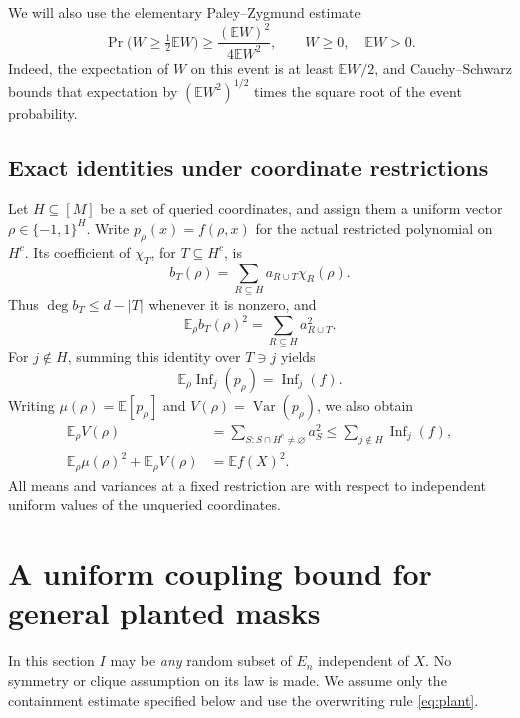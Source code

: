 \documentclass[11pt]{article}
\newcommand{\E}{\mathbb E}
\newcommand{\Var}{\operatorname{Var}}
\newcommand{\Inf}{\operatorname{Inf}}
\newcommand{\1}{\mathbf 1}
\theoremstyle{definition}
\theoremstyle{remark}
\numberwithin{equation}{section}
\begin{document}
We will also use the elementary Paley--Zygmund estimate
\begin{equation}\label{eq:pz}
 \Pr\bigl(W\ge\tfrac12\E W\bigr)
 \ge\frac{(\E W)^2}{4\E W^2},\qquad W\ge0,\quad\E W>0.
\end{equation}
Indeed, the expectation of $W$ on this event is at least $\E W/2$, and Cauchy--Schwarz bounds that expectation by $(\E W^2)^{1/2}$ times the square root of the event probability.

\subsection{Exact identities under coordinate restrictions}

Let $H\subseteq[M]$ be a set of queried coordinates, and assign them a uniform vector $\rho\in\{-1,1\}^H$. Write $p_\rho(x)=f(\rho,x)$ for the actual restricted polynomial on $H^c$. Its coefficient of $\chi_T$, for $T\subseteq H^c$, is
\begin{equation}\label{eq:restricted-coeff}
 b_T(\rho)=\sum_{R\subseteq H}a_{R\cup T}\chi_R(\rho).
\end{equation}
Thus $\deg b_T\le d-|T|$ whenever it is nonzero, and
\[
 \E_\rho b_T(\rho)^2=\sum_{R\subseteq H}a_{R\cup T}^2.
\]
For $j\notin H$, summing this identity over $T\ni j$ yields
\begin{equation}\label{eq:restricted-inf}
 \E_\rho\Inf_j(p_\rho)=\Inf_j(f).
\end{equation}
Writing $\mu(\rho)=\E[p_\rho]$ and $V(\rho)=\Var(p_\rho)$, we also obtain
\begin{align}
 \E_\rho V(\rho)
 &=\sum_{S:S\cap H^c\ne\varnothing}a_S^2
 \le\sum_{j\notin H}\Inf_j(f),\label{eq:restricted-var}\\
 \E_\rho\mu(\rho)^2+\E_\rho V(\rho)
 &=\E f(X)^2.\label{eq:restricted-norm}
\end{align}
All means and variances at a fixed restriction are with respect to independent uniform values of the unqueried coordinates.

\section{A uniform coupling bound for general planted masks}

In this section $I$ may be \emph{any} random subset of $E_n$ independent of $X$. No symmetry or clique assumption on its law is made. We assume only the containment estimate specified below and use the overwriting rule \eqref{eq:plant}.
\end{document}
